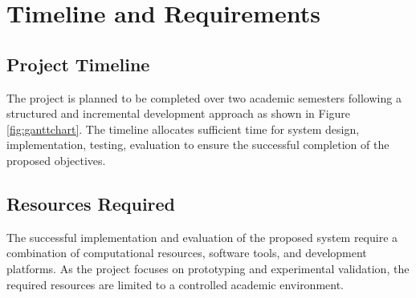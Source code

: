 \chapter{Timeline and Requirements}

\section{Project Timeline}

The project is planned to be completed over two academic semesters following
a structured and incremental development approach as shown in Figure \ref{fig:ganttchart}. The timeline allocates
sufficient time for system design, implementation, testing, evaluation to ensure the successful completion of the proposed objectives.


\section{Resources Required}

The successful implementation and evaluation of the proposed system require a combination of computational resources, software tools, and development platforms. As the project focuses on prototyping and experimental validation, the required resources are limited to a controlled academic environment. 


